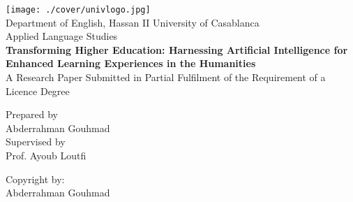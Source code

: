 \begin{titlepage}
  \centering
  \texttt{[image: ./cover/univlogo.jpg]} \\
  \centering
  Department of English, Hassan II University of Casablanca \\
  Applied Language Studies \\
  \vspace*{2cm}
  \textbf{\huge Transforming Higher Education: Harnessing Artificial Intelligence for Enhanced Learning Experiences in the Humanities} \\
  \vspace*{2cm}
  A Research Paper Submitted in Partial Fulfilment of the Requirement of a Licence Degree \\
  \vspace*{7cm}

  \begin{center}
    Prepared by\\ Abderrahman
    Gouhmad\\ Supervised by \\
    Prof. Ayoub Loutfi \\
  \end{center}
  \newpage
  \thispagestyle{empty}
  \vspace*{20cm}
  Copyright by:\\
  Abderrahman Gouhmad 

  \vspace*{\fill}
  \mydate
\end{titlepage}